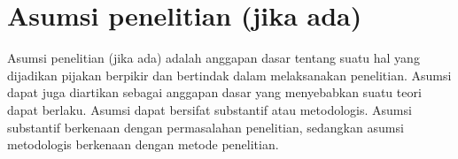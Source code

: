 \section{Asumsi penelitian (jika ada)}
Asumsi penelitian (jika ada) adalah anggapan dasar tentang suatu hal yang dijadikan pijakan berpikir dan bertindak dalam melaksanakan penelitian. Asumsi dapat juga diartikan sebagai anggapan dasar yang menyebabkan suatu teori dapat berlaku. Asumsi dapat bersifat substantif atau metodologis. Asumsi substantif berkenaan dengan permasalahan penelitian, sedangkan asumsi metodologis berkenaan dengan metode penelitian.

